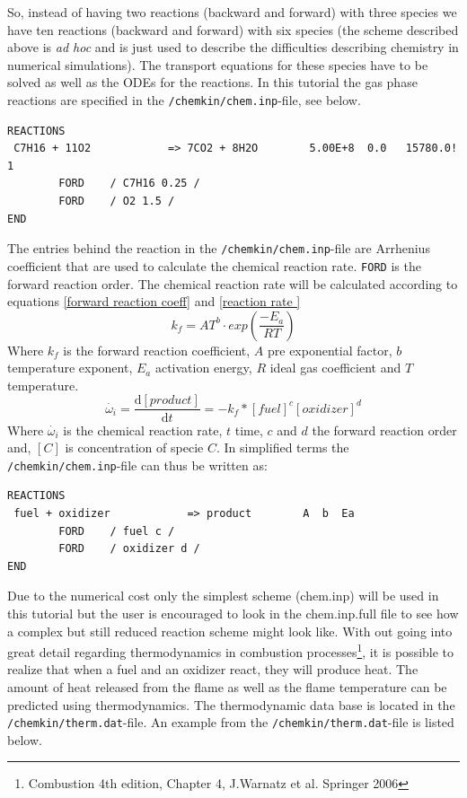 \documentclass{report}
\begin{document}
\noindent
So, instead of having two reactions (backward and forward) with three species we have ten reactions (backward and forward) with six species (the scheme described above is \textit{ad hoc} and is just used to describe the difficulties describing chemistry in numerical simulations). The transport equations for these species have to be solved as well as the ODEs for the reactions. 
\noindent
In this tutorial the gas phase reactions are specified in the \verb+/chemkin/chem.inp+-file, see below. 
\begin{verbatim}
REACTIONS
 C7H16 + 11O2            => 7CO2 + 8H2O        5.00E+8  0.0   15780.0! 1
        FORD    / C7H16 0.25 /
        FORD    / O2 1.5 /
END
\end{verbatim}
The entries behind the reaction in the  \verb+/chemkin/chem.inp+-file are Arrhenius coefficient that are used to calculate the chemical reaction rate. \verb+FORD+ is the forward reaction order. The chemical reaction rate will be calculated according to equations \ref{forward reaction coeff} and \ref{reaction rate }
\begin{equation}
\label{forward reaction coeff}
k_{f} = A  T^{b} \cdot exp \left(\frac{-E_{a}}{RT}\right) 	
\end{equation}
Where $k_{f}$ is the forward reaction coefficient, $A$ pre exponential factor, $b$ temperature exponent, $E_a$ activation energy, $R$ ideal gas coefficient and $T$ temperature.    
\begin{equation}
\label{reaction rate }
\dot{\omega_i}=\frac{ \text{d}   [product]}{\text{d}t}= -k_{f} * [fuel]^{c}  [oxidizer]^{d}
\end{equation}  
Where $\dot{\omega_i}$ is the chemical reaction rate, $t$  time, $c$ and $d$ the forward reaction order and, $[ C ]$ is concentration of specie $C$. In simplified terms the \verb+/chemkin/chem.inp+-file can thus be written as:
\begin{verbatim}
REACTIONS
 fuel + oxidizer            => product        A  b  Ea 
        FORD    / fuel c /
        FORD    / oxidizer d /
END
\end{verbatim} 
\noindent
Due to the numerical cost only the simplest scheme (chem.inp) will be used in this tutorial but the user is encouraged to look in the chem.inp.full file to see how a complex but still reduced reaction scheme might look like.
\newline 
\newline
\noindent
With out going into great detail regarding thermodynamics in combustion processes\footnote{Combustion 4th edition, Chapter 4, J.Warnatz et al. Springer 2006}, it is possible to realize that when a fuel and an oxidizer react, they will produce heat. The amount of heat released from the flame as well as the flame temperature can be predicted using thermodynamics. The thermodynamic data base is located in the  \verb+/chemkin/therm.dat+-file. An example from the \verb+/chemkin/therm.dat+-file is listed below.  
\end{document}
